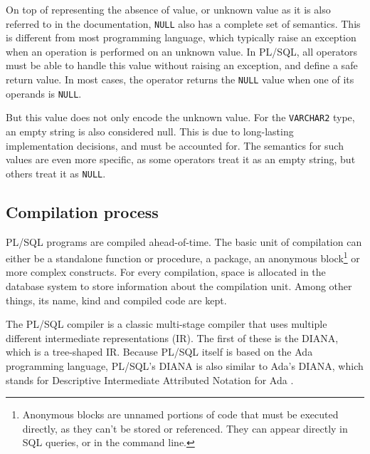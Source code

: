 \documentclass[twoside,11pt,a4paper]{article}
\newcommand{\maybe}[1]{\textit{(maybe ? #1)}}
\newcommand{\pls}[1]{\small\texttt{#1}\normalsize}
\newcommand{\plstype}[1]{\pls{#1}}
\newcommand{\varchar}{\plstype{VARCHAR2}}
\newcommand{\plsnull}{\pls{NULL}}
\begin{document}

On top of representing the absence of value, or unknown value as it is also referred to in the documentation, \plsnull{} also has a complete set of semantics. This is different from most programming language, which typically raise an exception when an operation is performed on an unknown value. In PL/SQL, all operators must be able to handle this value without raising an exception, and define a safe return value. In most cases, the operator returns the \plsnull{} value when one of its operands is \plsnull{}.

But this value does not only encode the unknown value. For the \varchar{} type, an empty string is also considered null. This is due to long-lasting implementation decisions, and must be accounted for. The semantics for such values are even more specific, as some operators treat it as an empty string, but others treat it as \plsnull{}.

\subsection{Compilation process}
\label{sec:plscompilation}


PL/SQL programs are compiled ahead-of-time. The basic unit of compilation can either be a standalone function or procedure, a package, an anonymous block\footnote{Anonymous blocks are unnamed portions of code that must be executed directly, as they can't be stored or referenced. They can appear directly in SQL queries, or in the command line.} or more complex constructs. For every compilation, space is allocated in the database system to store information about the compilation unit. Among other things, its name, kind and compiled code are kept.

The PL/SQL compiler is a classic multi-stage compiler that uses multiple different intermediate representations (IR). The first of these is the DIANA, which is a tree-shaped IR. Because PL/SQL itself is based on the Ada programming language, PL/SQL's DIANA is also similar to Ada's DIANA, which stands for Descriptive Intermediate Attributed Notation for Ada \cite{dianabook}.
\end{document}
